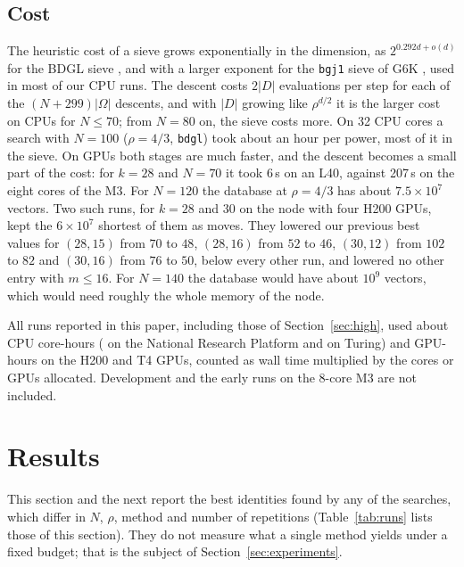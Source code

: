\documentclass[11pt]{amsart}
\theoremstyle{definition}
\theoremstyle{remark}
\begin{document}
\subsection{Cost}\label{sec:cost}
The heuristic cost of a sieve grows exponentially in the dimension, as $2^{0.292d+o(d)}$ for
the BDGL sieve \cite{BeckerDucasGamaLaarhoven2016}, and with a larger exponent for the
\texttt{bgj1} sieve of G6K \cite{AlbrechtEtAl2019,BeckerGamaJoux2015}, used in most of our CPU
runs. The descent costs $2|D|$ evaluations per
step for each of the $(N+299)|\Omega|$ descents, and with $|D|$ growing like $\rho^{d/2}$ it is the
larger cost on CPUs for $N\le70$; from $N=80$ on, the sieve costs more. On 32 CPU cores a
search with $N=100$ ($\rho=4/3$, \texttt{bdgl}) took about an hour per power, most of it in the sieve. On
GPUs both stages are much faster, and the descent becomes a small part of the cost: for $k=28$
and $N=70$ it took 6\,s on an L40, against 207\,s on the eight cores of the M3. For $N=120$ the
database at $\rho=4/3$ has about $7.5\times10^7$ vectors. Two such runs, for $k=28$ and $30$ on
the node with four H200 GPUs, kept the $6\times10^7$ shortest of them as moves. They lowered our
previous best values for $(28,15)$ from $70$ to $48$, $(28,16)$ from $52$ to $46$, $(30,12)$ from
$102$ to $82$ and $(30,16)$ from $76$ to $50$, below every other run, and lowered no other entry
with $m\le16$. For $N=140$ the database would have about $10^9$ vectors, which would need roughly
the whole memory of the node.

All runs reported in this paper, including those of Section~\ref{sec:high}, used about
\CoreHoursTotal{} CPU core-hours (\CoreHoursNRP{} on the National Research Platform and
\CoreHoursTuring{} on Turing) and \GPUHours{} GPU-hours on the H200 and T4 GPUs, counted as
wall time multiplied by the cores or GPUs allocated. Development and the early runs on the 8-core M3
are not included.

\section{Results}\label{sec:results}

This section and the next report the best identities found by any of the searches, which
differ in $N$, $\rho$, method and number of repetitions (Table~\ref{tab:runs} lists those of this
section).
They do not measure what a single method yields under a fixed budget; that is the subject of
Section~\ref{sec:experiments}.
\end{document}
